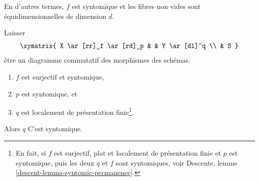 \noindent
En d'autres termes, $f$ est syntomique et les fibres non vides sont équidimensionnelles de dimension $d$.

\begin{lemma}

\label{lemma-syntomic-permanence}

Laisser
$$
\xymatrix{
X \ar[rr]_f \ar[rd]_p & &
Y \ar[dl]^q \\
& S
}
$$
être un diagramme commutatif des morphismes des schémas.

\begin{enumerate}

\item  $f$ est surjectif et syntomique,
\item  $p$ est syntomique, et
\item  $q$ est localement de présentation finie\footnote{En fait, si $f$ est surjectif, plat et localement de présentation finie et $p$ est syntomique, puis les deux $q$ et $f$ sont syntomiques, voir Descente, lemme \ref{descent-lemma-syntomic-permanence}.}.

\end{enumerate}

Alors $q$ C'est syntomique.

\end{lemma}

